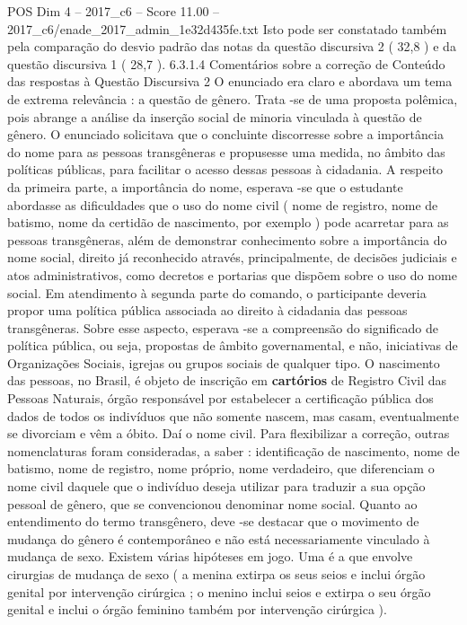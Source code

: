 \begin{textsample}{POS Dim 4 – 2017\_c6 – Score 11.00 – 2017\_c6/enade\_2017\_admin\_1e32d435fe.txt}
Isto pode ser constatado também pela comparação do desvio padrão das notas da questão discursiva 2 ( 32,8 ) e da questão discursiva 1 ( 28,7 ). 6.3.1.4 Comentários sobre a correção de Conteúdo das respostas à Questão Discursiva 2 O enunciado era claro e abordava um tema de extrema relevância : a questão de gênero.
Trata -se de uma proposta polêmica, pois abrange a análise da inserção social de minoria vinculada à questão de gênero.
O enunciado solicitava que o concluinte discorresse sobre a importância do nome para as pessoas transgêneras e propusesse uma medida, no âmbito das políticas públicas, para facilitar o acesso dessas pessoas à cidadania.
A respeito da primeira parte, a importância do nome, esperava -se que o estudante abordasse as dificuldades que o uso do nome civil ( nome de registro, nome de batismo, nome da certidão de nascimento, por exemplo ) pode acarretar para as pessoas transgêneras, além de demonstrar conhecimento sobre a importância do nome social, direito já reconhecido através, principalmente, de decisões judiciais e atos administrativos, como decretos e portarias que dispõem sobre o uso do nome social.
Em atendimento à segunda parte do comando, o participante deveria propor uma política pública associada ao direito à cidadania das pessoas transgêneras.
Sobre esse aspecto, esperava -se a compreensão do significado de política pública, ou seja, propostas de âmbito governamental, e não, iniciativas de Organizações Sociais, igrejas ou grupos sociais de qualquer tipo.
O nascimento das pessoas, no Brasil, é objeto de inscrição em \textbf{cartórios} de Registro Civil das Pessoas Naturais, órgão responsável por estabelecer a certificação pública dos dados de todos os indivíduos que não somente nascem, mas casam, eventualmente se divorciam e vêm a óbito.
Daí o nome civil.
Para flexibilizar a correção, outras nomenclaturas foram consideradas, a saber : identificação de nascimento, nome de batismo, nome de registro, nome próprio, nome verdadeiro, que diferenciam o nome civil daquele que o indivíduo deseja utilizar para traduzir a sua opção pessoal de gênero, que se convencionou denominar nome social.
Quanto ao entendimento do termo transgênero, deve -se destacar que o movimento de mudança do gênero é contemporâneo e não está necessariamente vinculado à mudança de sexo.
Existem várias hipóteses em jogo.
Uma é a que envolve cirurgias de mudança de sexo ( a menina extirpa os seus seios e inclui órgão genital por intervenção cirúrgica ; o menino inclui seios e extirpa o seu órgão genital e inclui o órgão feminino também por intervenção cirúrgica ).

\end{textsample}
